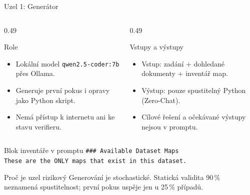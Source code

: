 \documentclass[aspectratio=169,11pt]{beamer}
\begin{document}
\begin{frame}[t]{Uzel 1: Generátor}
  \small
  \begin{columns}[T,onlytextwidth]
    \begin{column}{0.49\textwidth}
      \begin{block}{Role}
        \begin{itemize}
          \item Lokální model \texttt{qwen2.5-coder:7b} přes Ollama.
          \item Generuje první pokus i opravy jako Python skript.
          \item Nemá přístup k internetu ani ke stavu verifieru.
        \end{itemize}
      \end{block}
    \end{column}
    \begin{column}{0.49\textwidth}
      \begin{block}{Vstupy a výstupy}
        \begin{itemize}
          \item Vstup: zadání + dohledané dokumenty + inventář map.
          \item Výstup: pouze spustitelný Python (Zero-Chat).
          \item Cílové řešení a očekávané výstupy nejsou v promptu.
        \end{itemize}
      \end{block}
    \end{column}
  \end{columns}

  \begin{exampleblock}{Blok inventáře v promptu}
    \texttt{\#\#\# Available Dataset Maps}\\
    \texttt{These are the ONLY maps that exist in this dataset.}
  \end{exampleblock}

  \begin{alertblock}{Proč je uzel rizikový}
    Generování je stochastické. Statická validita 90\,\% neznamená
    spustitelnost; první pokus uspěje jen u 25\,\% případů.
  \end{alertblock}
\end{frame}
\end{document}
